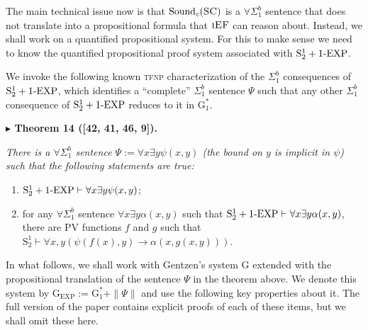 \documentclass[11pt]{article}
\newcommand{\Stwo}{\mathrm{S}^{1}_{2}}
\newcommand{\oneEXP}{\textnormal{1-EXP}}
\newcommand{\SC}{\textsc{SC}}
\newcommand{\iEF}{\textsc{iEF}}
\newcommand{\PV}{\mathrm{PV}}
\newcommand{\GEXP}{\mathrm{G}_{\mathrm{EXP}}}
\newcommand{\Gstar}{\mathrm{G}^{*}_{1}}
\newcommand{\Snd}{\mathrm{Sound}}
\newenvironment{statement}[1]%
  {\par\medskip\noindent\textbf{#1}\par\nopagebreak\smallskip\noindent\itshape}%
  {\par\medskip}
\begin{document}
The main technical issue now is that $\Snd_{c}(\SC)$ is a $\forall\Sigma^{b}_{1}$ sentence that
does not translate into a propositional formula that $\iEF$ can reason about. Instead, we shall
work on a quantified propositional system. For this to make sense we need to know the quantified
propositional proof system associated with $\Stwo+\oneEXP$.

We invoke the following known \textsc{tfnp} characterization of the $\Sigma^{b}_{1}$ consequences
of $\Stwo+\oneEXP$, which identifies a ``complete'' $\Sigma^{b}_{1}$ sentence $\Psi$ such that any
other $\Sigma^{b}_{1}$ consequence of $\Stwo+\oneEXP$ reduces to it in $\Gstar$.


\begin{statement}{$\blacktriangleright$ Theorem 14 ([42, 41, 46, 9]).}
There is a $\forall\Sigma^{b}_{1}$ sentence $\Psi := \forall x\exists y\psi(x,y)$ (the bound on
$y$ is implicit in $\psi$) such that the following statements are true:
\begin{enumerate}
\item[(i)] $\Stwo+\oneEXP \vdash \forall x\exists y\psi(x,y)$;
\item[(ii)] for any $\forall\Sigma^{b}_{1}$ sentence $\forall x\exists y\alpha(x,y)$ such that
  $\Stwo+\oneEXP \vdash \forall x\exists y\alpha(x,y)$, there are $\PV$ functions $f$ and $g$ such
  that $\Stwo \vdash \forall x,y(\psi(f(x),y) \rightarrow \alpha(x,g(x,y)))$.
\end{enumerate}
\end{statement}

In what follows, we shall work with Gentzen's system $\mathrm{G}$ extended with the propositional
translation of the sentence $\Psi$ in the theorem above. We denote this system by
$\GEXP := \Gstar + \|\Psi\|$ and use the following key properties about it. The full version of
the paper contains explicit proofs of each of these items, but we shall omit these here.
\end{document}
